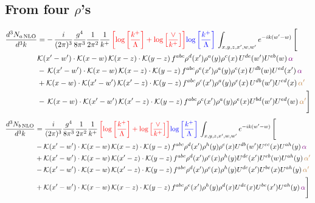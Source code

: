 \documentclass[9pt]{article}
\numberwithin{equation}{section}
\begin{document}
\subsection{From four $\rho$'s}
\begin{align}
    \frac{d^{3}N_{a\,\rm NLO}}{d^{3}k} & = -\,\frac{i}{(2\pi)^{3}}\frac{g^{4}}{8\pi^{3}}\frac{1}{2\pi^{2}} \frac{1}{k^{+}}\,{\color{teal}{\color{red}\left[\log{\left[\frac{k^{+}}{\Lambda}\right]}+\log{\left[\frac{\vee}{k^{+}}\right]}\right]}{\color{blue}\log{\left[\frac{k^{+}}{\Lambda}\right]}}}\,\int_{x,y,z,x^{\prime},w,w^{\prime}}e^{-ik(w^{\prime}-w)}\, \Bigg[\notag \\ &  \mathcal{K}(x'-w')\cdot \mathcal{K}(x-w)\, \mathcal{K}(x-z)\cdot \mathcal{K}(y-z)\, f^{a b c} \rho^{d}(x') \rho^{a}(y) \rho^{c}(x)\,U^{d e}(w') U^{e b}(w)\, {\color{violet} \alpha} \nonumber\\
    &  -\,\mathcal{K}(x'-w')\cdot \mathcal{K}(x-w)\, \mathcal{K}(x-z)\cdot \mathcal{K}(y-z)\, f^{a b c} \rho^{e}(x') \rho^{a}(y) \rho^{c}(x)\, U^{d b}(w) U^{e d}(x')\, {\color{violet} \alpha}\nonumber\\
    & + \mathcal{K}(x-w)\cdot \mathcal{K}(x'-w')\, \mathcal{K}(x'-z)\cdot \mathcal{K}(y-z)\, f^{a b c} \rho^{c}(x') \rho^{a}(y) \rho^{e}(x)\,U^{d b}(w') U^{e d}(x)\, {\color{brown} \alpha'} \nonumber\\
    & -\,\mathcal{K}(x-w)\cdot \mathcal{K}(x'-w')\, \mathcal{K}(x'-z)\cdot \mathcal{K}(y-z)\, f^{a b c} \rho^{c}(x') \rho^{a}(y) \rho^{e}(x) U^{b d}(w') U^{e d}(w)\, {\color{brown} \alpha'}\Bigg]
\end{align}
\begin{align}
      \frac{d^{3}N_{b\,\rm NLO}}{d^{3}k} & = \frac{i}{(2\pi)^{3}}\frac{g^{4}}{8\pi^{3}}\frac{1}{2\pi^{2}} \frac{1}{k^{+}}\,{\color{teal}{\color{red}\left[\log{\left[\frac{k^{+}}{\Lambda}\right]}+\log{\left[\frac{\vee}{k^{+}}\right]}\right]}{\color{blue}\log{\left[\frac{k^{+}}{\Lambda}\right]}}}\,\int_{x,y,z,x^{\prime},w,w^{\prime}}e^{-ik(w^{\prime}-w)}\, \Bigg[\notag \\ & - \mathcal{K}(x'-w')\cdot \mathcal{K}(x-w)\, \mathcal{K}(x-z)\cdot \mathcal{K}(y-z)\, f^{a b c} \rho^{d}(x') \rho^{h}(y) \rho^{e}(x) U^{d b}(w') U^{e c}(x) U^{a h}(y)\, {\color{violet} \alpha}\nonumber\\
    &+ \mathcal{K}(x'-w')\cdot \mathcal{K}(x-w)\,\mathcal{K}(x'-z)\cdot \mathcal{K}(y-z)\, f^{a b c} \rho^{d}(x') \rho^{e}(x) \rho^{h}(y) U^{d c}(x') U^{e b}(w) U^{a h}(y)\, {\color{brown} \alpha'}\nonumber\\
    &- \mathcal{K}(x'-w')\cdot \mathcal{K}(x-w)\,\mathcal{K}(x'-z)\cdot \mathcal{K}(y-z)\, f^{a b c} \rho^{d}(x') \rho^{e}(x) \rho^{h}(y) U^{d c}(x') U^{b e}(x) U^{a h}(y)\, {\color{brown} \alpha'}\nonumber\\
    &+  \mathcal{K}(x'-w')\cdot \mathcal{K}(x-w)\, \mathcal{K}(x-z)\cdot \mathcal{K}(y-z)\, f^{a b c} \rho^{e}(x') \rho^{h}(y) \rho^{d}(x) U^{d c}(x) U^{b e}(x') U^{a h}(y)\, {\color{violet} \alpha} \Bigg]
\end{align}
\end{document}
